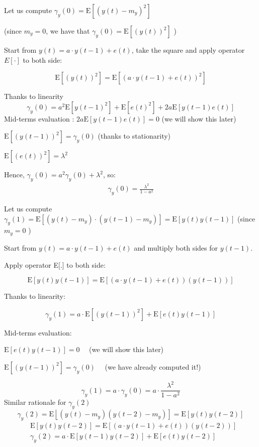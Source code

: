 Let us compute $\gamma_{y}(0)=\mathrm{E}\left[\left(y(t)-m_{y}\right)^{2}\right]$

(since $m_{y}=0$, we have that $\gamma_{y}(0)=\mathrm{E}\left[(y(t))^{2}\right]$ )

Start from $y(t)=a \cdot y(t-1)+e(t)$, take the square and apply operator $E[\cdot]$ to both side:

$$
\mathrm{E}\left[(y(t))^{2}\right]=\mathrm{E}\left[(a \cdot y(t-1)+e(t))^{2}\right]
$$

Thanks to linearity
$$
\gamma_{y}(0)=a^{2} \mathrm{E}\left[y(t-1)^{2}\right]+\mathrm{E}\left[e(t)^{2}\right]+2 a \mathrm{E}[y(t-1) e(t)]
$$
Mid-terms evaluation :
$2 a \mathrm{E}[y(t-1) e(t)]=0$ (we will show this later)

$\mathrm{E}\left[(y(t-1))^{2}\right]=\gamma_{y}(0)$ (thanks to stationarity)

$\mathrm{E}\left[(e(t))^{2}\right]=\lambda^{2}$

Hence, $\gamma_{y}(0)=a^{2} \gamma_{y}(0)+\lambda^{2}$, so:
\begin{align*}
	\gamma_{y}(0)=\frac{\lambda^{2}}{1-a^{2}}
\end{align*} 

Let us compute $\gamma_{y}(1)=\mathrm{E}\left[\left(y(t)-m_{y}\right) \cdot\left(y(t-1)-m_{y}\right)\right]=\mathrm{E}[y(t) y(t-1)]$ (since $m_{y}=0$ )

Start from $y(t)=a \cdot y(t-1)+e(t)$ and multiply both sides for $y(t-1)$.

Apply operator E[.] to both side:

$$\mathrm{E}[y(t) y(t-1)]=\mathrm{E}[(a \cdot y(t-1)+e(t))(y(t-1))]$$

Thanks to linearity:

$$\gamma_{y}(1)=a \cdot \mathrm{E}\left[(y(t-1))^{2}\right]+\mathrm{E}[e(t) y(t-1)]$$

Mid-terms evaluation:

$\mathrm{E}[e(t) y(t-1)]=0 \quad$ (we will show this later)

$\mathrm{E}\left[(y(t-1))^{2}\right]=\gamma_{y}(0) \quad$ (we have already computed it!)

$$
\gamma_{y}(1)=a \cdot \gamma_{y}(0)=a \cdot \frac{\lambda^{2}}{1-a^{2}}
$$
Similar rationale for $\gamma_{y}(2)$
$$
\gamma_{y}(2)=\mathrm{E}\left\lfloor\left(y(t)-m_{y}\right)\left(y(t-2)-m_{y}\right)\right]=\mathrm{E}[y(t) y(t-2)]
$$
\begin{align*}
	&\mathrm{E}[y(t) y(t-2)]=\mathrm{E}[(a \cdot y(t-1)+e(t))(y(t-2))] \\
	&\gamma_{y}(2)=a \cdot \mathrm{E}[y(t-1) y(t-2)]+\mathrm{E}[e(t) y(t-2)]
\end{align*}

